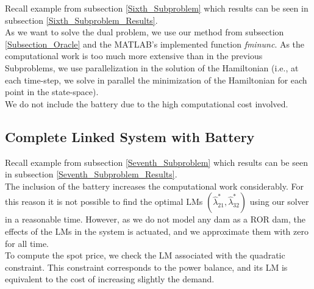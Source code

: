 Recall example from subsection \ref{Sixth_Subproblem} which results can be seen in subsection \ref{Sixth_Subproblem_Results}.\\

As we want to solve the dual problem, we use our method from subsection \ref{Subsection_Oracle} and the MATLAB's implemented function \textit{fminunc}. As the computational work is too much more extensive than in the previous Subproblems, we use parallelization in the solution of the Hamiltonian (i.e., at each time-step, we solve in parallel the minimization of the Hamiltonian for each point in the state-space).\\
We do not include the battery due to the high computational cost involved.

\subsection{Complete Linked System with Battery} \label{Seventh_Subproblem_Num}

Recall example from subsection \ref{Seventh_Subproblem}  which results can be seen in subsection \ref{Seventh_Subproblem_Results}.\\

The inclusion of the battery increases the computational work considerably. For this reason it is not possible to find the optimal LMs $(\hat{\lambda}^*_{21},\hat{\lambda}^*_{32})$ using our solver in a reasonable time. However, as we do not model any dam as a ROR dam, the effects of the LMs in the system is actuated, and we approximate them with zero for all time.\\
To compute the spot price, we check the LM associated with the quadratic constraint. This constraint corresponds to the power balance, and its LM is equivalent to the cost of increasing slightly the demand. 